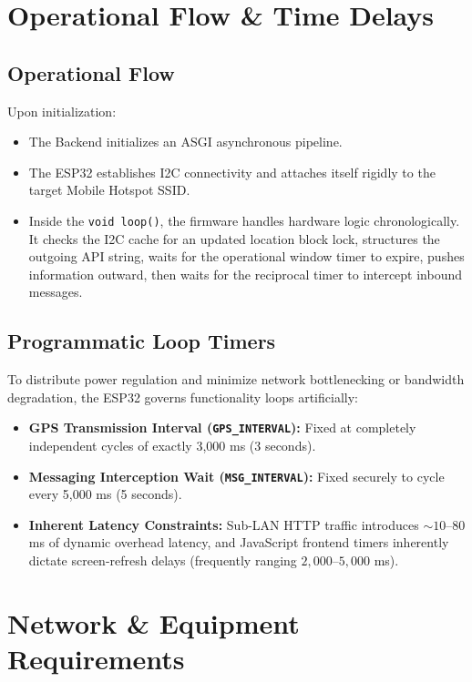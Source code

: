 \documentclass[a4paper,12pt]{article}
\begin{document}
\section{Operational Flow \& Time Delays}
\subsection{Operational Flow}
Upon initialization:
\begin{itemize}
    \item The Backend initializes an ASGI asynchronous pipeline.
    \item The ESP32 establishes I2C connectivity and attaches itself rigidly to the target Mobile Hotspot SSID. 
    \item Inside the \texttt{void loop()}, the firmware handles hardware logic chronologically. It checks the I2C cache for an updated location block lock, structures the outgoing API string, waits for the operational window timer to expire, pushes information outward, then waits for the reciprocal timer to intercept inbound messages.
\end{itemize}

\subsection{Programmatic Loop Timers}
To distribute power regulation and minimize network bottlenecking or bandwidth degradation, the ESP32 governs functionality loops artificially:
\begin{itemize}
    \item \textbf{GPS Transmission Interval (\texttt{GPS\_INTERVAL}):} Fixed at completely independent cycles of exactly 3,000 ms (3 seconds). 
    \item \textbf{Messaging Interception Wait (\texttt{MSG\_INTERVAL}):} Fixed securely to cycle every 5,000 ms (5 seconds). 
    \item \textbf{Inherent Latency Constraints:} Sub-LAN HTTP traffic introduces $\sim 10$--$80$ ms of dynamic overhead latency, and JavaScript frontend timers inherently dictate screen-refresh delays (frequently ranging $2,000$--$5,000$ ms).
\end{itemize}

\section{Network \& Equipment Requirements}
\end{document}
